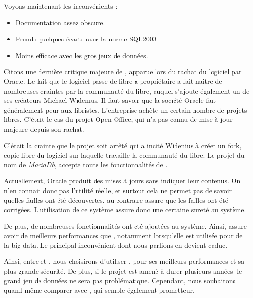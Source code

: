 Voyons maintenant les inconvénients :

\begin{itemize}
\item Documentation assez obscure. 
\item Prends quelques écarts avec la norme SQL2003
\item Moins efficace avec les gros jeux de données. 
\end{itemize} 

Citons une dernière critique majeure de \mysql, apparue lors du rachat du logiciel par Oracle. Le fait que le logiciel passe de libre à propriétaire a fait naitre de nombreuses craintes par la communauté du libre, auquel s'ajoute également un de ses créateurs Michael Widenius. Il faut savoir que la société Oracle fait généralement peur aux libristes. L'entreprise achète un certain nombre de projets libres. C'était le cas du projet Open Office, qui n'a pas connu de mise à jour majeure depuis son rachat. 

C'était la crainte que le projet soit arrêté qui a incité Widenius à créer un fork, copie libre du logiciel sur laquelle travaille la communauté du libre. Le projet du nom de \textit{MariaDb}, accepte toute les fonctionnalités  de \mysql. 

Actuellement, Oracle produit des mises à jours sans indiquer leur contenus. On n'en connait donc pas l'utilité réelle, et surtout cela ne permet pas de savoir quelles failles ont été découvertes. \mdb au contraire assure que les failles ont été corrigées. L'utilisation de ce système assure donc une certaine sureté au système. 

De plus, de nombreuses fonctionnalités ont été ajoutées au système. Ainsi, \mdb assure avoir de meilleurs performances que \mysql, notamment lorsqu'elle est utilisée pour de la big data. Le principal inconvénient dont nous parlions en devient caduc. 

\medbreak

Ainsi, entre \mysql et \mdb, nous choisirons d'utiliser \mdb, pour ses meilleurs performances et sa plus grande sécurité. De plus, si le projet est amené à durer plusieurs années, le grand jeu de données ne sera pas problématique. Cependant, nous souhaitons quand même comparer \mdb avec \psql, qui semble également prometteur. 



